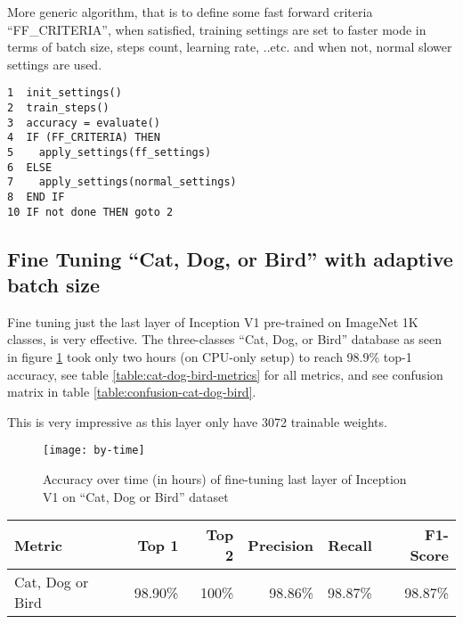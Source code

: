 More generic algorithm, that is to define some fast forward criteria ``FF\_CRITERIA'',
when satisfied, training settings are set to faster mode in terms of batch size, steps count, learning rate, ..etc.
and when not, normal slower settings are used. 

\begin{program}
\begin{verbatim}
1  init_settings()
2  train_steps()
3  accuracy = evaluate()
4  IF (FF_CRITERIA) THEN
5    apply_settings(ff_settings)
6  ELSE
7    apply_settings(normal_settings)
8  END IF
10 IF not done THEN goto 2
\end{verbatim}
\caption{more general adaptive batch size algorithm in pseudo code}
\end{program}

\subsection{Fine Tuning ``Cat, Dog, or Bird'' with adaptive batch size}

Fine tuning just the last layer of Inception V1 pre-trained on ImageNet 1K classes, is very effective.
The three-classes ``Cat, Dog, or Bird'' database as seen in figure \ref{fig:fine-cats}
took only two hours (on CPU-only setup) to reach 98.9\% top-1 accuracy,
see table \ref{table:cat-dog-bird-metrics} for all metrics, and see confusion matrix in table \ref{table:confusion-cat-dog-bird}.


This is very impressive as this layer only have 3072 trainable weights.

\begin{figure}[!h]
\centering
\texttt{[image: by-time]}
\caption{Accuracy over time (in hours) of fine-tuning last layer of Inception V1 on ``Cat, Dog or Bird'' dataset}\label{fig:fine-cats}
\end{figure}

\begin{table*}\caption{Performance metrics of fine-tuning single layer of Inception v1 on ``Cat, Dog or Bird'' Task}\label{table:cat-dog-bird-metrics}
\centering
\begin{tabularx}{\textwidth}{Xrrrrr}
\toprule
Metric         & Top 1   & Top 2 & Precision & Recall & F1-Score \\
\midrule
Cat, Dog or Bird & 98.90\% & 100\% & 98.86\%   & 98.87\% & 98.87\% \\
\bottomrule
\end{tabularx}
\end{table*}


